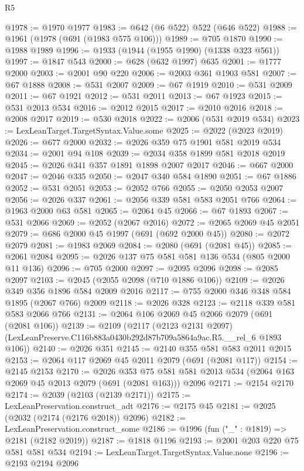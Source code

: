 \begin{lexlean}{R5}
\begin{coremodule}
@1978 := @1970 @1977
@1983 := @642 (@6 @522) @522 (@646 @522)
@1988 := @1961 (@1978 (@691 (@1983 @575 @106)))
@1989 := @705 @1870
@1990 := @1988 @1989
@1996 := @1933 (@1944 (@1955 @1990) (@1338 @323 @561))
@1997 := @1847 @543
@2000 := @628 (@632 @1997) @635
@2001 := @1777 @2000
@2003 := @2001 @90 @220
@2006 := @2003 @361 @1903 @581
@2007 := @67 @1888
@2008 := @531 @2007
@2009 := @67 @1919
@2010 := @531 @2009
@2011 := @67 @1921
@2012 := @531 @2011
@2013 := @67 @1923
@2015 := @531 @2013 @534
@2016 := @2012 @2015
@2017 := @2010 @2016
@2018 := @2008 @2017
@2019 := @530 @2018
@2022 := @2006 (@531 @2019 @534)
@2023 := LexLeanTarget.TargetSyntax.Value.some
@2025 := @2022 (@2023 @2019)
@2026 := @677 @2000
@2032 := @2026 @359 @75 @1901 @581 @2019 @534
@2034 := @2001 @94 @108
@2039 := @2034 @358 @1899 @581 @2018 @2019
@2045 := @2026 @341 @357 @1891 @1898 @2007 @2017
@2046 := @667 @2000
@2047 := @2046 @335
@2050 := @2047 @340 @584 @1890
@2051 := @67 @1886
@2052 := @531 @2051
@2053 := @2052 @766
@2055 := @2050 @2053 @2007
@2056 := @2026 @337
@2061 := @2056 @339 @581 @583 @2051 @766
@2064 := @1963 @2000 @63 @581
@2065 := @2064 @45
@2066 := @67 @1893
@2067 := @531 @2066
@2069 := @2052 (@2067 @2016)
@2072 := @2065 @2069 @45 @2051
@2079 := @686 @2000 @45 @1997 (@691 (@692 @2000 @45))
@2080 := @2072 @2079
@2081 := @1983 @2069
@2084 := @2080 (@691 (@2081 @45))
@2085 := @2061 @2084
@2095 := @2026 @137 @75 @581 @581 @136 @534 (@805 @2000 @11 @136)
@2096 := @705 @2000
@2097 := @2095 @2096
@2098 := @2085 @2097
@2103 := @2045 (@2055 @2098 (@710 @1886 @106))
@2109 := @2026 @349 @356 @1896 @584 @2009 @2016
@2117 := @755 @2000 @346 @348 @584 @1895 (@2067 @766) @2009
@2118 := @2026 @328
@2123 := @2118 @339 @581 @583 @2066 @766
@2131 := @2064 @106 @2069 @45 @2066 @2079 (@691 (@2081 @106))
@2139 := @2109
    (@2117
      (@2123 @2131 @2097)
      (LexLeanPreserve.C116b883a0430b292d87b709a5864a9ac.R5.__rel_6 @1893 @106))
@2140 := @2026 @351
@2145 := @2140 @355 @581 @583 @2011 @2015
@2153 := @2064 @117 @2069 @45 @2011 @2079 (@691 (@2081 @117))
@2154 := @2145 @2153
@2170 := @2026
    @353
    @75
    @581
    @581
    @2013
    @534
    (@2064 @163 @2069 @45 @2013 @2079 (@691 (@2081 @163)))
    @2096
@2171 := @2154 @2170
@2174 := @2039 (@2103 (@2139 @2171))
@2175 := LexLeanPreservation.construct_adt
@2176 := @2175 @45
@2181 := @2025 (@2032 (@2174 (@2176 @2018)) @2096)
@2182 := LexLeanPreservation.construct_some
@2186 := @1996 (fun ("_" : @1819) => @2181 (@2182 @2019))
@2187 := @1818 @1196
@2193 := @2001 @203 @220 @75 @581 @581 @534
@2194 := LexLeanTarget.TargetSyntax.Value.none
@2196 := @2193 @2194 @2096

\end{coremodule}
\end{lexlean}
